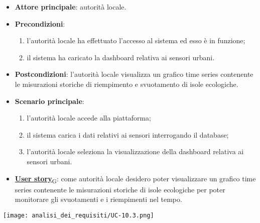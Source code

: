 \begin{itemize}
	\item \textbf{Attore principale}: autorità locale.
	\item \textbf{Precondizioni}:
	      \begin{enumerate}
		      \item l'autorità locale ha effettuato l'accesso al sistema ed esso è in funzione;
		      \item il sistema ha caricato la dashboard relativa ai sensori urbani.
	      \end{enumerate}
	\item \textbf{Postcondizioni}: l'autorità locale visualizza un grafico time series contenente le misurazioni storiche di riempimento e svuotamento
	      di isole ecologiche.
	\item \textbf{Scenario principale}:
	      \begin{enumerate}
		      \item l'autorità locale accede alla piattaforma;
		      \item il sistema carica i dati relativi ai sensori interrogando il database;
		      \item l'autorità locale seleziona la visualizzazione della dashboard relativa ai sensori urbani.
	      \end{enumerate}
	\item \href{https://7last.github.io/docs/pb/documentazione-interna/glossario\#user-story}{\textbf{User story}\textsubscript{G}}:
	      come autorità locale desidero poter visualizzare un grafico time series contenente le misurazioni storiche
	      di isole ecologiche per poter monitorare gli svuotamenti e i riempimenti nel tempo.
\end{itemize}
\begin{center}
	\texttt{[image: analisi\_dei\_requisiti/UC-10.3.png]}
\end{center}


